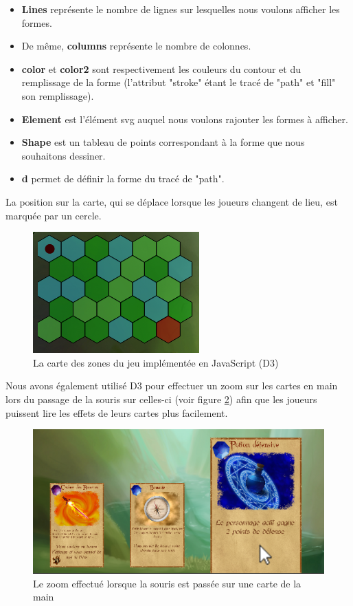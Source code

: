 \documentclass[12pt]{report}
\begin{document}
	\begin{itemize}
        	\item \textbf{Lines} représente le nombre de lignes sur lesquelles nous voulons afficher les formes.
        	\item De même, \textbf{columns} représente le nombre de colonnes. \item \textbf{color} et \textbf{color2} sont respectivement les couleurs du contour et du remplissage de la forme (l'attribut "stroke" étant le tracé de "path" et "fill" son remplissage). \item \textbf{Element} est l'élément svg auquel nous voulons rajouter les formes à afficher.
        	\item \textbf{Shape} est un tableau de points correspondant à la forme que nous souhaitons dessiner.
        	\item \textbf{d} permet de définir la forme du tracé de "path".
	\end{itemize}

	La position sur la carte, qui se déplace lorsque les joueurs changent de lieu, est marquée par un cercle.

	\begin{figure}[h!]
		\centering
		\includegraphics[scale=0.8]{images/map.png}
		\caption{La carte des zones du jeu implémentée en JavaScript (D3)}
		\label{fig:map}
	\end{figure}

    Nous avons également utilisé D3 pour effectuer un zoom sur les cartes en main lors du passage de la souris sur celles-ci (voir figure \ref{fig:zoom}) afin que les joueurs puissent lire les effets de leurs cartes plus facilement.

	\begin{figure}[h!]
		\centering
		\includegraphics[scale=0.6]{images/zoom.png}
		\caption{Le zoom effectué lorsque la souris est passée sur une carte de la main}
		\label{fig:zoom}
	\end{figure}
\end{document}
